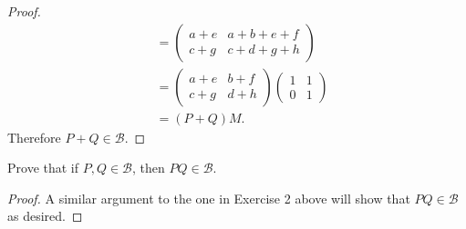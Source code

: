 \begin{proof}
\begin{align*}
             &= \begin{pmatrix}
               a + e & a + b + e + f \\
               c + g & c + d + g + h
             \end{pmatrix} \\
             &= \begin{pmatrix}
               a + e & b + f \\
               c + g & d + h
             \end{pmatrix}
               \begin{pmatrix}
                 1 & 1 \\ 0 & 1
               \end{pmatrix} \\
             &= (P + Q)M.
  \end{align*}
  Therefore $P + Q\in\mathcal{B}$.
\end{proof}

Prove that if $P, Q\in\mathcal{B}$, then $PQ\in\mathcal{B}$.
\begin{proof}
  A similar argument to the one in Exercise 2 above will show that
  $PQ\in\mathcal{B}$ as desired.
\end{proof}

